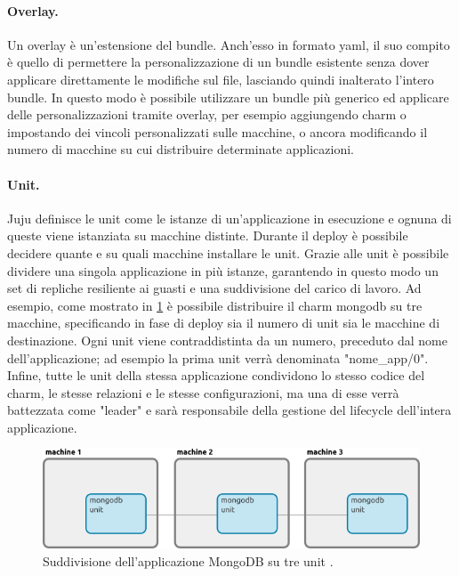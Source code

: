 \paragraph{Overlay.}
Un overlay è un'estensione del bundle.
% 
Anch'esso in formato yaml, il suo compito è quello di permettere la personalizzazione di un bundle esistente senza dover applicare direttamente le modifiche sul file, lasciando quindi inalterato l'intero bundle.
% 
In questo modo è possibile utilizzare un bundle più generico ed applicare delle personalizzazioni tramite overlay, per esempio aggiungendo charm o impostando dei vincoli personalizzati sulle macchine, o ancora modificando il numero di macchine su cui distribuire determinate applicazioni.

\paragraph{Unit.}
Juju definisce le unit \cite{juju_unit} come le istanze di un'applicazione in esecuzione e ognuna di queste viene istanziata su macchine distinte.
% 
Durante il deploy è possibile decidere quante e su quali macchine installare le unit.
% 
Grazie alle unit è possibile dividere una singola applicazione in più istanze, garantendo in questo modo un set di repliche resiliente ai guasti e una suddivisione del carico di lavoro.
% 
Ad esempio, come mostrato in \cref{fig:juju_units} è possibile distribuire il charm mongodb su tre macchine, specificando in fase di deploy sia il numero di unit sia le macchine di destinazione.
% 
Ogni unit viene contraddistinta da un numero, preceduto dal nome dell'applicazione;
% 
ad esempio la prima unit verrà denominata "nome\_app/0".
% 
Infine, tutte le unit della stessa applicazione condividono lo stesso codice del charm, le stesse relazioni e le stesse configurazioni, ma una di esse verrà battezzata come "leader" e sarà responsabile della gestione del lifecycle dell'intera applicazione.
\begin{figure}[H]
    \centering
    \includegraphics[width=0.8\linewidth]{tesi/files/immagini/juju/units}
    \caption{Suddivisione dell'applicazione MongoDB su tre unit \cite{juju_unit}.}
    \label{fig:juju_units}
\end{figure}


